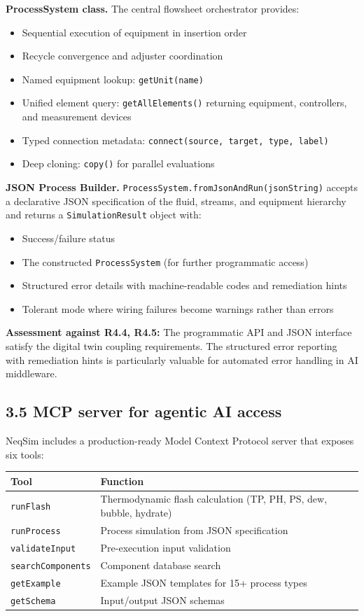 \documentclass[review,3p]{custom}
\begin{document}
\textbf{ProcessSystem class.} The central flowsheet orchestrator provides:
\begin{itemize}
  \item Sequential execution of equipment in insertion order
  \item Recycle convergence and adjuster coordination
  \item Named equipment lookup: \texttt{getUnit(name)}
  \item Unified element query: \texttt{getAllElements()} returning equipment, controllers, and measurement devices
  \item Typed connection metadata: \texttt{connect(source, target, type, label)}
  \item Deep cloning: \texttt{copy()} for parallel evaluations
\end{itemize}

\textbf{JSON Process Builder.} \texttt{ProcessSystem.fromJsonAndRun(jsonString)} accepts a declarative JSON specification of the fluid, streams, and equipment hierarchy and returns a \texttt{SimulationResult} object with:
\begin{itemize}
  \item Success/failure status
  \item The constructed \texttt{ProcessSystem} (for further programmatic access)
  \item Structured error details with machine-readable codes and remediation hints
  \item Tolerant mode where wiring failures become warnings rather than errors
\end{itemize}

\textbf{Assessment against R4.4, R4.5:} The programmatic API and JSON interface satisfy the digital twin coupling requirements. The structured error reporting with remediation hints is particularly valuable for automated error handling in AI middleware.

\subsection{3.5 MCP server for agentic AI access}

NeqSim includes a production-ready Model Context Protocol server that exposes six tools:

\begin{table}[htbp]
\centering
\begin{tabular}{ll}
\toprule
Tool & Function \\
\midrule
\texttt{runFlash} & Thermodynamic flash calculation (TP, PH, PS, dew, bubble, hydrate) \\
\texttt{runProcess} & Process simulation from JSON specification \\
\texttt{validateInput} & Pre-execution input validation \\
\texttt{searchComponents} & Component database search \\
\texttt{getExample} & Example JSON templates for 15+ process types \\
\texttt{getSchema} & Input/output JSON schemas \\
\bottomrule
\end{tabular}
\end{table}
\end{document}
